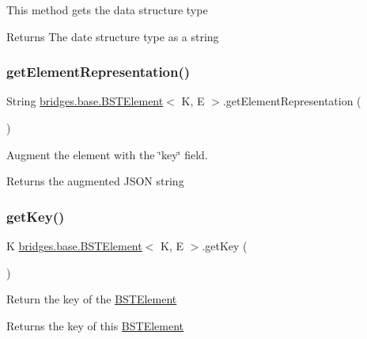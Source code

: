 This method gets the data structure type

\begin{DoxyReturn}{Returns}
The date structure type as a string 
\end{DoxyReturn}
\mbox{\label{classbridges_1_1base_1_1_b_s_t_element_a0619c81bb38df6fc64a651a909f64d84}} 
\subsubsection{\texorpdfstring{get\+Element\+Representation()}{getElementRepresentation()}}
{\footnotesize\ttfamily String \hyperlink{classbridges_1_1base_1_1_b_s_t_element}{bridges.\+base.\+B\+S\+T\+Element}$<$ K, E $>$.get\+Element\+Representation (\begin{DoxyParamCaption}{ }\end{DoxyParamCaption})}

Augment the element with the \char`\"{}key\char`\"{} field.

\begin{DoxyReturn}{Returns}
the augmented J\+S\+ON string 
\end{DoxyReturn}
\mbox{\label{classbridges_1_1base_1_1_b_s_t_element_afba950fad36d3327b01003df3ba4cc9f}} 
\subsubsection{\texorpdfstring{get\+Key()}{getKey()}}
{\footnotesize\ttfamily K \hyperlink{classbridges_1_1base_1_1_b_s_t_element}{bridges.\+base.\+B\+S\+T\+Element}$<$ K, E $>$.get\+Key (\begin{DoxyParamCaption}{ }\end{DoxyParamCaption})}

Return the key of the \hyperlink{classbridges_1_1base_1_1_b_s_t_element}{B\+S\+T\+Element}

\begin{DoxyReturn}{Returns}
the key of this \hyperlink{classbridges_1_1base_1_1_b_s_t_element}{B\+S\+T\+Element} 
\end{DoxyReturn}
\mbox{\label{classbridges_1_1base_1_1_b_s_t_element_a8abdd6e4a0486de7fa45fbb233b56688}} 

